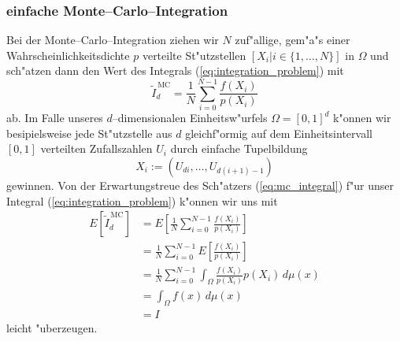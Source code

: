 \documentclass[11pt,a4paper,DIVcalc,BCOR8mm,titlepage,twoside]{scrartcl}
\begin{document}
	\subsubsection{einfache Monte--Carlo--Integration}
	Bei der Monte--Carlo--Integration ziehen wir $N$ zuf"allige, gem"a"s einer Wahrscheinlichkeitsdichte $p$ verteilte St"utzstellen $[X_i|i\in\{1,\dots,N\}]$ in $\Omega$ und sch"atzen dann den Wert des Integrals (\ref{eq:integration_problem}) mit
	\begin{equation}
		{\tilde I}_d^{\,\text{MC}}=\frac{1}{N}\sum_{i=0}^{N-1} \frac{f(X_i)}{p(X_i)}
		\label{eq:mc_integral}
	\end{equation}
	ab. Im Falle unseres $d$--dimensionalen Einheitsw"urfels $\Omega=[0,1]^d$ k"onnen wir besipielsweise jede St"utzstelle aus $d$ gleichf"ormig auf dem Einheitsintervall $[0,1]$ verteilten Zufallszahlen $U_i$ durch einfache Tupelbildung
	$$X_i:=(U_{d i},\dots,U_{d(i+1)-1})$$
	gewinnen. Von der Erwartungstreue des Sch"atzers (\ref{eq:mc_integral}) f"ur unser Integral (\ref{eq:integration_problem}) k"onnen wir uns mit \citep[][2.4]{Veach:1997p9136}
	\begin{align*}
		E[{\tilde I}_d^{\,\text{MC}}] &=E\left[\frac{1}{N}\sum_{i=0}^{N-1}\frac{f(X_i)}{p(X_i)}\right] \\
			&= \frac{1}{N}\sum_{i=0}^{N-1}E\left[\frac{f(X_i)}{p(X_i)}\right] \\
			&= \frac{1}{N}\sum_{i=0}^{N-1}\int_\Omega \frac{f(X_i)}{p(X_i)}p(X_i)\,d\mu(x) \\
			&= \int_\Omega f(x)\,d\mu(x)\\
			&= I
	\end{align*}
	leicht "uberzeugen.
	
\end{document}
